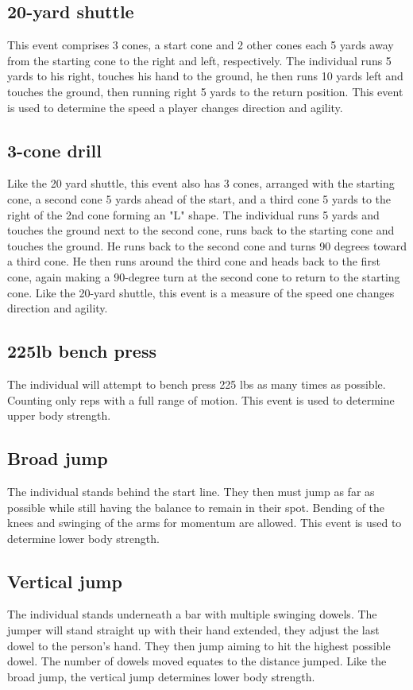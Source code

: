 \documentclass[confrence]{IEEEtran}
\begin{document}
\subsection*{20-yard shuttle}
This event comprises 3 cones, a start cone and 2 other cones each 5 yards away from the starting cone to the right and left, respectively.
The individual runs 5 yards to his right, touches his hand to the ground, he then runs 10 yards left and touches the ground, then running right 5 yards to the return position.
This event is used to determine the speed a player changes direction and agility.
\subsection*{3-cone drill}
Like the 20 yard shuttle, this event also has 3 cones, arranged with the starting cone, a second cone 5 yards ahead of the start, and a third cone 5 yards to the right of the 2nd cone forming an "L" shape.
The individual runs 5 yards and touches the ground next to the second cone, runs back to the starting cone and touches the ground.
He runs back to the second cone and turns 90 degrees toward a third cone.
He then runs around the third cone and heads back to the first cone, again making a 90-degree turn at the second cone to return to the starting cone.
Like the 20-yard shuttle, this event is a measure of the speed one changes direction and agility.
\subsection*{225lb bench press}
The individual will attempt to bench press 225 lbs as many times as possible.
Counting only reps with a full range of motion.
This event is used to determine upper body strength.
\subsection*{Broad jump}
The individual stands behind the start line.
They then must jump as far as possible while still having the balance to remain in their spot.
Bending of the knees and swinging of the arms for momentum are allowed.
This event is used to determine lower body strength.
\subsection*{Vertical jump}
The individual stands underneath a bar with multiple swinging dowels.
The jumper will stand straight up with their hand extended, they adjust the last dowel to the person's hand.
They then jump aiming to hit the highest possible dowel.
The number of dowels moved equates to the distance jumped.
Like the broad jump, the vertical jump determines lower body strength.
\end{document}
